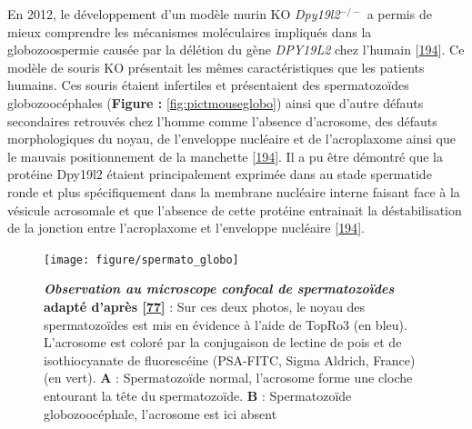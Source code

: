 \documentclass[12pt,a4paper,twoside]{ugathesis}
\theoremstyle{definition}
\theoremstyle{definition}
\theoremstyle{definition}
\theoremstyle{remark}
\begin{document}
En 2012, le développement d'un modèle murin KO \emph{Dpy19l2}\(^{-/-}\)
a permis de mieux comprendre les mécanismes moléculaires impliqués dans
la globozoospermie causée par la délétion du gène \emph{DPY19L2} chez
l'humain {[}\protect\hyperlink{ref-Pierre2012}{194}{]}. Ce modèle de
souris KO présentait les mêmes caractéristiques que les patients
humains. Ces souris étaient infertiles et présentaient des
spermatozoïdes globozoocéphales (\textbf{Figure :
}\ref{fig:pictmouseglobo}) ainsi que d'autre défauts secondaires
retrouvés chez l'homme comme l'absence d'acrosome, des défauts
morphologiques du noyau, de l'enveloppe nucléaire et de l'acroplaxome
ainsi que le mauvais positionnement de la manchette
{[}\protect\hyperlink{ref-Pierre2012}{194}{]}. Il a pu être démontré que
la protéine Dpy19l2 étaient principalement exprimée dans au stade
spermatide ronde et plus spécifiquement dans la membrane nucléaire
interne faisant face à la vésicule acrosomale et que l'absence de cette
protéine entrainait la déstabilisation de la jonction entre
l'acroplaxome et l'enveloppe nucléaire
{[}\protect\hyperlink{ref-Pierre2012}{194}{]}.

\newpage

\begin{figure}

{\centering \texttt{[image: figure/spermato\_globo]} 

}

\caption[Observation au microscope confocal de spermatozoïdes]{\textbf{\emph{Observation au microscope confocal de
spermatozoïdes} adapté d'après
{[}\protect\hyperlink{ref-Harbuz2011}{77}{]}} : Sur ces deux photos, le
noyau des spermatozoïdes est mis en évidence à l'aide de TopRo3 (en
bleu). L'acrosome est coloré par la conjugaison de lectine de pois et de
isothiocyanate de fluorescéine (PSA-FITC, Sigma Aldrich, France) (en
vert). \textbf{A} : Spermatozoïde normal, l'acrosome forme une cloche
entourant la tête du spermatozoïde. \textbf{B} : Spermatozoïde
globozoocéphale, l'acrosome est ici absent}\label{fig:pictglobospz}
\end{figure}
\end{document}

